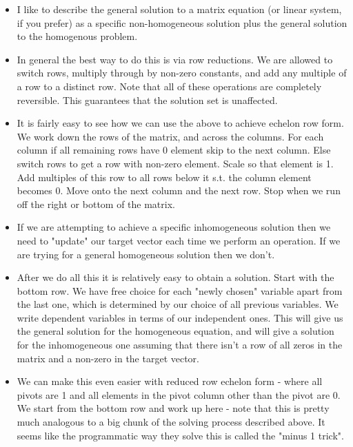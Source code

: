 \documentclass{article}
\begin{document}
\begin{itemize}
		\item I like to describe the general solution to a matrix equation (or linear system, if you prefer) as a specific non-homogeneous solution plus the general solution to the homogenous problem.
		
		\item In general the best way to do this is via row reductions. We are allowed to switch rows, multiply through by non-zero constants, and add any multiple of a row to a distinct row. Note that all of these operations are completely reversible. This guarantees that the solution set is unaffected.
		
		\item It is fairly easy to see how we can use the above to achieve echelon row form. We work down the rows of the matrix, and across the columns. For each column if all remaining rows have 0 element skip to the next column. Else switch rows to get a row with non-zero element. Scale so that element is 1. Add multiples of this row to all rows below it s.t. the column element becomes 0. Move onto the next column and the next row. Stop when we run off the right or bottom of the matrix.
		
		\item If we are attempting to achieve a specific inhomogeneous solution then we need to "update" our target vector each time we perform an operation. If we are trying for a general homogeneous solution then we don't.
		
		\item After we do all this it is relatively easy to obtain a solution. Start with the bottom row. We have free choice for each "newly chosen" variable apart from the last one, which is determined by our choice of all previous variables. We write dependent variables in terms of our independent ones. This will give us the general solution for the homogeneous equation, and will give a solution for the inhomogeneous one assuming that there isn't a row of all zeros in the matrix and a non-zero in the target vector.
		
		\item We can make this even easier with reduced row echelon form - where all pivots are 1 and all elements in the pivot column other than the pivot are 0. We start from the bottom row and work up here - note that this is pretty much analogous to a big chunk of the solving process described above. It seems like the programmatic way they solve this is called the "minus 1 trick".
		

\end{itemize}
\end{document}
